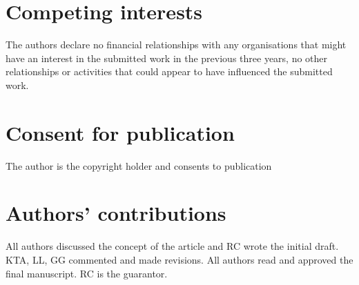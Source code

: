 \documentclass[twocolumn]{bmcart}%
\begin{document}
\begin{backmatter}
\section*{Competing interests}
The authors declare no financial
relationships with any organisations that might have an interest in the
submitted work in the previous three years, no other relationships or
activities that could appear to have influenced the submitted work.

\section*{Consent for publication}%
The author is the copyright holder and consents to publication

\section*{Authors' contributions}
All authors discussed the concept of the
article and RC wrote the initial draft. KTA, LL, GG commented and made
revisions. All authors read and approved the final manuscript. RC is the
guarantor.





\end{backmatter}
\end{document}
